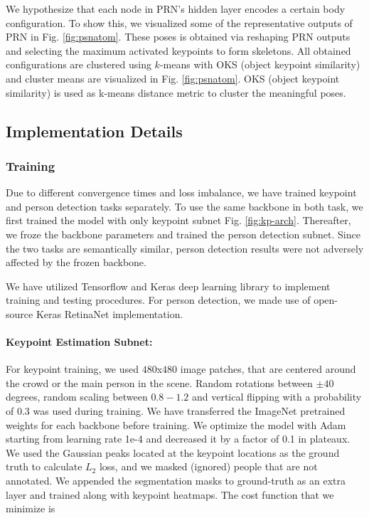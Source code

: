 \documentclass[runningheads]{llncs}
\begin{document}
We hypothesize that each node in PRN's hidden layer encodes a certain body configuration. To show this, we visualized some of the representative outputs of PRN in Fig. \ref{fig:psnatom}. These poses is obtained via reshaping PRN outputs and selecting the maximum activated keypoints to form skeletons. All obtained configurations are clustered using $k$-means with OKS (object keypoint similarity)\cite{Lin2014} and cluster means are visualized in Fig. \ref{fig:psnatom}. OKS (object keypoint similarity) is used as k-means distance metric to cluster the meaningful poses.
 








\subsection{Implementation Details} 
\subsubsection{Training}
Due to different convergence times and loss imbalance, we have trained keypoint and person detection tasks separately. To use the same backbone in both task, we first trained the model with only keypoint subnet Fig. \ref{fig:kp-arch}. Thereafter, we froze the backbone parameters and trained the person detection subnet. Since the two tasks are semantically similar, person detection results were not adversely affected by the frozen backbone. 


We have utilized Tensorflow \cite{tensorflow2015-whitepaper} and Keras \cite{chollet2015keras} deep learning library to implement training and testing procedures. For person detection, we made use of open-source Keras RetinaNet\cite{hans_gaiser_2018_1188105} implementation.
\paragraph{Keypoint Estimation Subnet:} 
For keypoint training, we used $480$x$480$ image patches, that are centered around the crowd or the main person in the scene. Random rotations between $\pm 40$ degrees, random scaling between $0.8-1.2$ and vertical flipping with a probability of 0.3 was used during training. We have transferred the ImageNet \cite{imagenet} pretrained weights for each backbone before training. We optimize the model with Adam \cite{Kingma} starting from learning rate 1e-4 and decreased it by a factor of 0.1 in plateaux. We used the Gaussian peaks located at the keypoint locations as the ground truth to calculate $L_2$ loss, and we masked (ignored) people that are not annotated. We appended the segmentation masks to ground-truth as an extra layer and trained along with keypoint heatmaps. The cost function that we minimize is 
\end{document}
